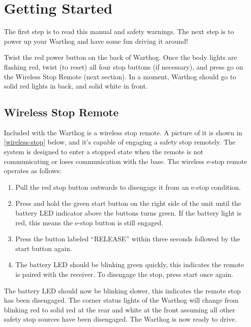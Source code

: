 \documentclass[]{clearpath-latex/clearpath-manual}
\begin{document}
\section{Getting Started}

The first step is to read this manual and safety warnings.  The next step is to power up your Warthog and have some fun driving it around!

Twist the red power button on the back of Warthog. Once the body lights are flashing red, twist (to reset) all four stop buttons (if necessary), and press go on the Wireless Stop Remote (next section). In a moment, Warthog should go to solid red lights in back, and solid white in front.

\subsection{Wireless Stop Remote}

Included with the Warthog is a wireless stop remote. A picture of it is shown in
\autoref{wireless-stop} below, and it's capable of engaging a safety stop remotely.  The system is designed to enter a stopped state when the remote is not communicating or loses communication with the base. The wireless e-stop remote operates as follows:

\begin{enumerate}
  \item Pull the red stop button outwards to disengage it from an e-stop condition.
  \item Press and hold the green start button on the right side of the unit until the battery LED indicator above the buttons turns green. If the battery light is red, this means the e-stop button is still engaged.
  \item Press the button labeled “RELEASE” within three seconds followed by the start button again.
  \item The battery LED should be blinking green quickly, this indicates the remote is paired with the receiver. To disengage the stop, press start once again.
\end{enumerate}

The battery LED should now be blinking slower, this indicates the remote stop has been disengaged. The corner status lights of the Warthog will change from blinking red to solid red at the rear and white at the front assuming all other safety stop sources have been disengaged. The Warthog is now ready to drive.
\end{document}
